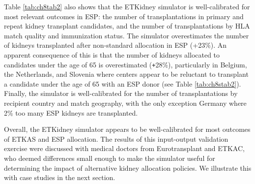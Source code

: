 \documentclass[11pt,twoside,]{book}
\def\Plus{\texttt{+}}
\begin{document}
Table \ref{tab:ch8tab2} also shows that the ETKidney simulator is
well-calibrated for most relevant outcomes in ESP: the number of transplantations in
primary and repeat kidney transplant candidates, and the number of
transplantations by HLA match quality and immunization status. The simulator
overestimates the number of kidneys transplanted after non-standard allocation
in ESP (+23\%). An apparent consequence of this is that the number of
kidneys allocated to candidates under the age of 65 is overestimated
(\Plus 28\%), particularly in Belgium, the
Netherlands, and Slovenia where
centers appear to be reluctant to transplant a candidate under the age of 65
with an ESP donor (see Table \ref{tab:ch8stab2}). Finally, the simulator is well-calibrated for the
number of transplantations by recipient country and match geography,
with the only exception Germany where 2\% too many ESP kidneys are
transplanted.

\newpage
Overall, the ETKidney simulator appears to be well-calibrated for most
outcomes of ETKAS and ESP allocation. The results of this input-output
validation exercise were discussed with medical doctors from
Eurotransplant and ETKAC, who deemed differences small enough to make
the simulator useful for determining the impact of alternative kidney
allocation policies. We illustrate this with case studies in the next
section.

\FloatBarrier
\end{document}
